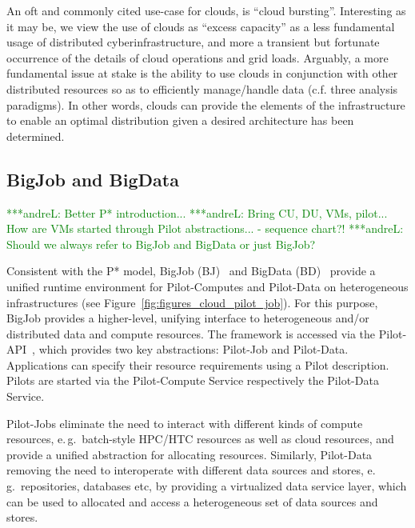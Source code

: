 \documentclass[times]{cpeauth}
\newcommand{\jhanote}[1]{ {\textcolor{red} { ***shantenu: #1 }}}
\newcommand{\alnote}[1]{ {\textcolor{green} { ***andreL: #1 }}}
\newcommand{\alnote}[1]{}
\newcommand{\jhanote}[1]{}
\newcommand{\pilot}{Pilot\xspace}
\newcommand{\pilots}{Pilots\xspace}
\newcommand{\pilotjob}{Pilot-Job\xspace}
\newcommand{\pilotjobs}{Pilot-Jobs\xspace}
\newcommand{\pilotcomputes}{Pilot-Computes\xspace}
\newcommand{\pilotdata}{Pilot-Data\xspace}
\newcommand{\pilotdataservice}{Pilot-Data Service\xspace}
\newcommand{\pilotcomputeservice}{Pilot-Compute Service\xspace}
\begin{document}
An oft and commonly cited use-case for clouds, is ``cloud bursting''.
Interesting as it may be, we view the use of clouds as ``excess
capacity'' as a less fundamental usage of distributed
cyberinfrastructure, and more a transient but fortunate occurrence of
the details of cloud operations and grid loads. Arguably, a more
fundamental issue at stake is the ability to use clouds in conjunction
with other distributed resources so as to efficiently manage/handle
data (c.f. three analysis paradigms).  In other words, clouds can
provide the elements of the infrastructure to enable an optimal
distribution given a desired architecture has been determined.






\subsection{BigJob and  BigData}

\alnote{Better P* introduction...}
\alnote{Bring CU, DU, VMs, pilot... How are VMs started through Pilot 
abstractions... - sequence chart?!}
\alnote{Should we always refer to BigJob and BigData or just BigJob?}

Consistent with the P* model, BigJob (BJ)~\cite{saga_bigjob_condor_cloud} and
BigData (BD)~\cite{Mantha:2012:PEF:2287016.2287020} provide a unified runtime
environment for \pilotcomputes and \pilotdata on heterogeneous infrastructures
(see Figure~\ref{fig:figures_cloud_pilot_job}). For this purpose, BigJob
provides a higher-level, unifying interface to heterogeneous and/or
distributed data and compute resources. The framework is accessed via the
Pilot-API~\cite{pilot_api}, which provides two key abstractions: \pilotjob and
\pilotdata. Applications can specify their resource requirements using a
\pilot description. \pilots are started via the \pilotcomputeservice
respectively the \pilotdataservice.

\pilotjobs eliminate the need to interact with different kinds of compute 
resources, e.\,g.\ batch-style HPC/HTC resources as well as cloud resources, 
and provide a unified abstraction for allocating resources. Similarly, 
\pilotdata removing the need to interoperate with different data sources and 
stores, e.\,g.\ repositories, databases etc, by providing a virtualized data 
service layer, which can be used to allocated and access a heterogeneous set 
of data sources and stores.
\end{document}
